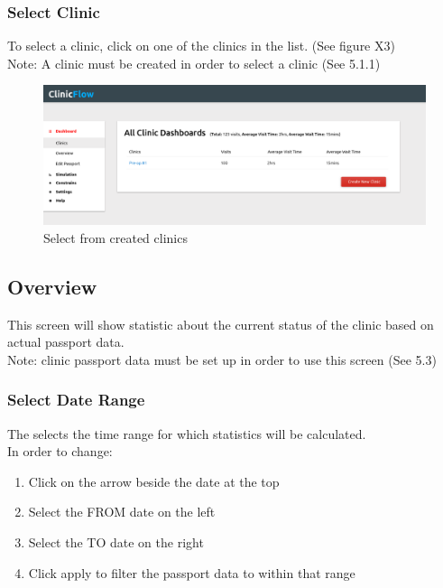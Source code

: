 \documentclass[12pt]{article}
\begin{document}
\subsubsection{Select Clinic}
To select a clinic, click on one of the clinics in the list. (See figure X3)\\
Note: A clinic must be created in order to select a clinic (See 5.1.1)

\begin{figure}[H]
\centering
\includegraphics[width=\textwidth]{selectclinic}
\caption{Select from created clinics}
\end{figure}

\subsection{Overview}
This screen will show statistic about the current status of the clinic based on actual passport data.\\

Note: clinic passport data must be set up in order to use this screen (See 5.3)

\subsubsection{Select Date Range}
The selects the time range for which statistics will be calculated.\\
In order to change:
\begin{enumerate}
\item Click on the arrow beside the date at the top
\item Select the FROM date on the left
\item Select the TO date on the right
\item Click apply to filter the passport data to within that range
\pagebreak
\end{enumerate}
\end{document}

